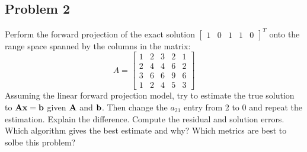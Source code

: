 \subsection{Problem 2}%
\label{sec:problem_2}
Perform the forward projection of the exact solution
$\begin{bmatrix} 1 & 0 & 1 & 1 & 0 \end{bmatrix}^T$
onto the range space spanned by the columns in the matrix:
\begin{equation*}
    A = \begin{bmatrix}
        1 & 2 & 3 & 2 & 1 \\
        2 & 4 & 4 & 6 & 2 \\
        3 & 6 & 6 & 9 & 6 \\
        1 & 2 & 4 & 5 & 3
\end{bmatrix}
\end{equation*}
Assuming the linear forward projection model, try to estimate the true solution to
$\mathbf{Ax} = \mathbf{b}$ given $\mathbf{A}$ and $\mathbf{b}$.
Then change the $a_{21}$ entry from 2 to 0 and repeat the estimation.
Explain the difference.
Compute the residual and solution errors.
Which algorithm gives the best estimate and why?
Which metrics are best to solbe this problem?
